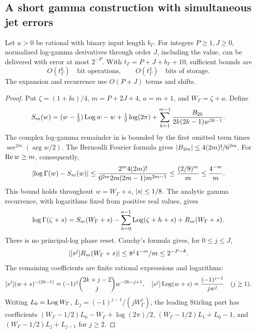 \subsection{A short gamma construction with simultaneous jet errors}
\label{subsec:short-gamma}
\begin{proposition}\label{prop:gamma-provider}
Let \(u>0\) be rational with binary input length \(b_\Gamma\).
For integers \(P\ge1,J\ge0\), normalized log-gamma derivatives
through order \(J\), including the value, can be delivered with
error at most \(2^{-P}\). With
\(t_\Gamma=P+J+b_\Gamma+10\), sufficient bounds are
\[
 O(t_\Gamma^6)\quad\text{bit operations},\qquad
 O(t_\Gamma^3)\quad\text{bits of storage}.
\]
The expansion and recurrence use \(O(P+J)\) terms and shifts.
\end{proposition}
\begin{proof}
Put \(\zeta=(1+\ii u)/4\), \(m=P+2J+4\), \(a=m+1\),
and \(W_\Gamma=\zeta+a\). Define
\begin{equation}
 S_m(w)=(w-\tfrac12)\operatorname{Log} w-w+\tfrac12\log(2\pi)
       +\sum_{k=1}^{m-1}\frac{B_{2k}}{2k(2k-1)w^{2k-1}}.
 \label{eq:short-stirling}
\end{equation}
The complex log-gamma remainder in \cite[\S5.11(ii)]{dlmfgamma}
is bounded by the first omitted term times
\(\sec^{2m}(\arg w/2)\). The Bernoulli Fourier formula
\cite{dlmfbernoulli} gives \(\lvert B_{2m}\rvert\le4(2m)!/6^{2m}\).
For \(\operatorname{Re} w\ge m\), consequently,
\begin{equation}
 \lvert \log\Gamma(w)-S_m(w)\rvert
 \le \frac{2^m4(2m)!}{6^{2m}2m(2m-1)m^{2m-1}}
 \le\frac{(2/9)^m}{m}\le\frac{4^{-m}}m.
 \label{eq:short-gamma-remainder}
\end{equation}
This bound holds throughout \(w=W_\Gamma+s\), \(\lvert s\rvert\le1/8\).
The analytic gamma recurrence, with logarithms fixed from positive real
values, gives
\[
 \log\Gamma(\zeta+s)=S_m(W_\Gamma+s)
       -\sum_{h=0}^{a-1}\operatorname{Log}(\zeta+h+s)+R_m(W_\Gamma+s).
\]
There is no principal-log phase reset. Cauchy's formula gives, for
\(0\le j\le J\),
\begin{equation}
 \lvert [s^j]R_m(W_\Gamma+s)\rvert
       \le8^j4^{-m}/m\le2^{-P-8}.
 \label{eq:gamma-jet-remainder}
\end{equation}
The remaining coefficients are finite rational expressions and logarithms:
\[
 [s^j](w+s)^{-(2k-1)}
   =(-1)^j\binom{2k+j-2}{j}w^{-2k-j+1},\quad
 [s^j]\operatorname{Log}(w+s)=\frac{(-1)^{j-1}}{jw^j}\quad(j\ge1).
\]
Writing \(L_0=\operatorname{Log} W_\Gamma\),
\(L_j=(-1)^{j-1}/(jW_\Gamma^j)\), the leading Stirling part has
coefficients \((W_\Gamma-1/2)L_0-W_\Gamma+\log(2\pi)/2\),
\((W_\Gamma-1/2)L_1+L_0-1\), and
\((W_\Gamma-1/2)L_j+L_{j-1}\) for \(j\ge2\).


\end{proof}
